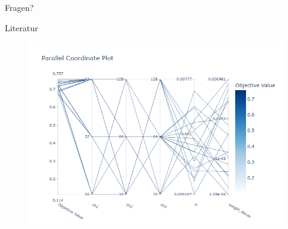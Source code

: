 \documentclass[
  fontsize=10pt, 
  aspectratio=169,
  xcolor={dvipsnames}
]{beamer}
\newlength{\imagewidth}
\newlength{\imageheight}
\newcommand{\improve}{%
    \textcolor{coloryellow}{IMPROVE}%
    \PackageWarning{JHstyle}{You used the 'improve' macro at this line. Remove it before finalising document}%
}
\begin{document}




\begin{frame}[label=conclusion, standout]
  Fragen?
\end{frame}

\appendix

\begin{frame}[allowframebreaks]{Literatur}
  \nocite{*}
  \printbibliography[heading=none]
\end{frame}

\begin{frame}
  \begin{figure}
    \centering
    \includegraphics[width=\imagewidth, height=\imageheight, keepaspectratio]{parallel_coordinate.png}
  \end{figure}
\end{frame}
\end{document}
